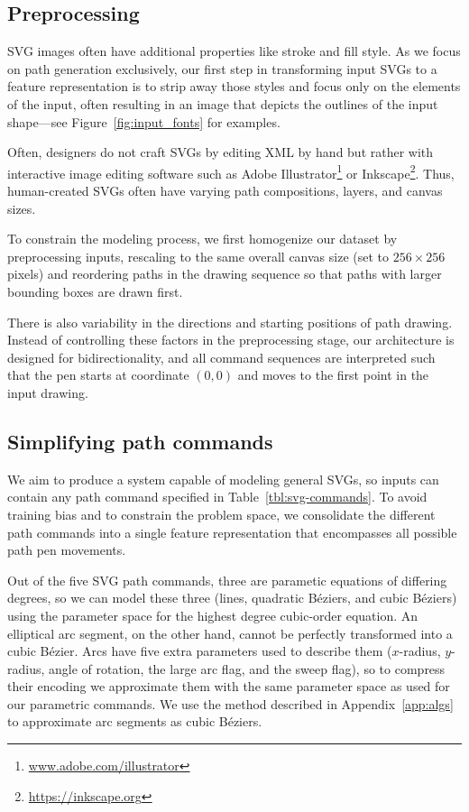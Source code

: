 \subsection{Preprocessing}
SVG images often have additional properties like stroke and fill style.
As we focus on path generation exclusively, our first step in transforming input SVGs to a feature representation is to strip away those styles and focus only on the  elements of the input, often resulting in an image that depicts the outlines of the input shape---see Figure~\ref{fig:input_fonts} for examples.

Often, designers do not craft SVGs by editing XML by hand but rather with interactive image editing software such as Adobe Illustrator\footnote{\url{www.adobe.com/illustrator}} or Inkscape\footnote{\url{https://inkscape.org}}.
Thus, human-created SVGs often have varying path compositions, layers, and canvas sizes.

To constrain the modeling process, we first homogenize our dataset by preprocessing inputs, rescaling to the same overall canvas size (set to $256\times 256$ pixels) and reordering paths in the drawing sequence so that paths with larger bounding boxes are drawn first.

There is also variability in the directions and starting positions of path drawing.
Instead of controlling these factors in the preprocessing stage, our architecture is designed for bidirectionality, and all command sequences are interpreted such that the pen starts at coordinate $(0, 0)$ and moves to the first point in the input drawing.

\subsection{Simplifying path commands}
We aim to produce a system capable of modeling general SVGs, so inputs can contain any path command specified in Table~\ref{tbl:svg-commands}.
To avoid training bias and to constrain the problem space, we consolidate the different path commands into a single feature representation that encompasses all possible path pen movements.

Out of the five SVG path commands, three are parametic equations of differing degrees, so we can model these three (lines, quadratic B\'eziers, and cubic B\'eziers) using the parameter space for the highest degree cubic-order equation.
An elliptical arc segment, on the other hand, cannot be perfectly transformed into a cubic B\'ezier.
Arcs have five extra parameters used to describe them ($x$-radius, $y$-radius, angle of rotation, the large arc flag, and the sweep flag), so to compress their encoding we approximate them with the same parameter space as used for our parametric commands.
We use the method described in Appendix~\ref{app:algs} to approximate arc segments as cubic B\'eziers.

